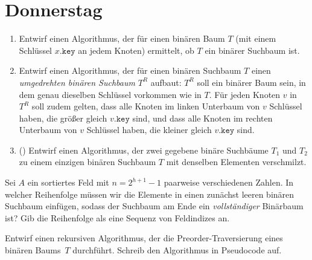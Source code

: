 \documentclass{uebung_cs}
\begin{document}
\section*{Donnerstag}
\begin{aufgabe}\mbox{}
	\begin{enumerate}
		\item Entwirf einen Algorithmus, der für einen binären Baum $T$ (mit einem Schlüssel $x.\texttt{key}$ an jedem Knoten) ermittelt, ob $T$ ein binärer Suchbaum ist.
		\item Entwirf einen Algorithmus, der für einen binären Suchbaum $T$ einen \textit{umgedrehten binären Suchbaum} $T^R$ aufbaut:
		$T^R$ soll ein binärer Baum sein, in dem genau dieselben Schlüssel vorkommen wie in $T$.
		Für jeden Knoten $v$ in $T^R$ soll zudem gelten, dass alle Knoten im linken Unterbaum von $v$ Schlüssel haben, die größer gleich $v.\texttt{key}$ sind, und dass alle Knoten im rechten Unterbaum von $v$ Schlüssel haben, die kleiner gleich $v.\texttt{key}$ sind.
		\item (\hard) Entwirf einen Algorithmus, der zwei gegebene binäre Suchbäume $T_1$ und $T_2$ zu einem einzigen binären Suchbaum $T$ mit denselben Elementen verschmilzt.
	\end{enumerate}
\end{aufgabe}

\begin{aufgabe}
	Sei $A$ ein sortiertes Feld mit $n = 2^{h+1}-1$ paarweise verschiedenen Zahlen.
	In welcher Reihenfolge müssen wir die Elemente in einen zunächst leeren binären Suchbaum einfügen, sodass der Suchbaum am Ende ein \emph{vollständiger} Binärbaum ist?
	Gib die Reihenfolge als eine Sequenz von Feldindizes an.
\end{aufgabe}

\begin{aufgabe}
	Entwirf einen rekursiven Algorithmus, der die Preorder-Traversierung eines binären Baums~$T$ durchführt.
	Schreib den Algorithmus in Pseudocode auf.
\end{aufgabe}
\end{document}
